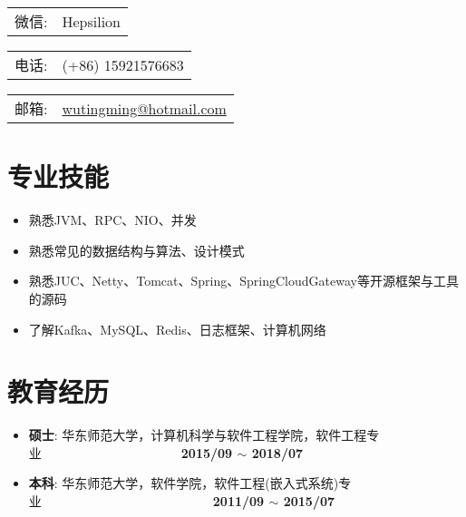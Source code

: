 \documentclass[letterpaper, UTF8, 11pt]{article}
\def\name{\textbf{\textcolor[rgb]{0.00, 0.00, 0.00}{\fontsize{30pt}{30pt}吴庭明}} ~~~~~~~~~ \fontsize{15pt}{15pt}}
\begin{document}
	
	\noindent{\bf \name} 
	\vspace{0.1in}

	\begin{minipage}{0.2\linewidth}
		\begin{tabular}{ll}
			微信:   & Hepsilion 
		\end{tabular}
	\end{minipage}
	\begin{minipage}{0.3\linewidth}
		\begin{tabular}{ll}
			电话:   & (+86) 15921576683  
		\end{tabular}
	\end{minipage}
	\begin{minipage}{0.5\linewidth}
		\begin{tabular}{ll}
			邮箱:   & \href{mailto:wutingming@hotmail.com}{ wutingming@hotmail.com} 
		\end{tabular}
	\end{minipage}
	\vspace{-0.4in}
	
	
	\section*{\textbf{专业技能}}\vspace{-0.15in}
	\begin{itemize}
		\item 熟悉JVM、RPC、NIO、并发
		\item 熟悉常见的数据结构与算法、设计模式
		\item 熟悉JUC、Netty、Tomcat、Spring、SpringCloudGateway等开源框架与工具的源码
		\item 了解Kafka、MySQL、Redis、日志框架、计算机网络

	\end{itemize}
	\vspace{-0.25in}
	
	\section*{\textbf{教育经历}}\vspace{-0.15in}
	\begin{itemize}
		\item \textbf{硕士}: 华东师范大学，计算机科学与软件工程学院，软件工程专业~~~~~~~~~~~~~~~~~~~~~~\textbf{2015/09 $\sim$ 2018/07}
		\item \textbf{本科}: 华东师范大学，软件学院，软件工程(嵌入式系统)专业~~~~~~~~~~~~~~~~~~~~~~~~~~~\textbf{2011/09 $\sim$ 2015/07}
	\end{itemize}
	\vspace{-0.25in}
	
\end{document}

